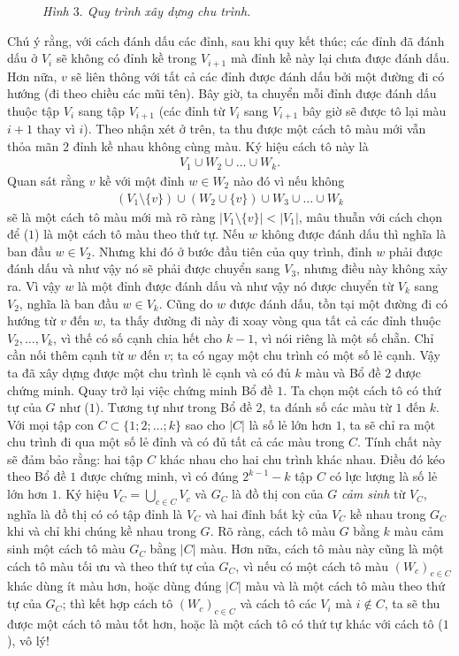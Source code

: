 \begin{multicols}{2}
\begin{figure}[H]
		\caption{\small\textit{\color{hoccungpi}Hình $3.$ Quy trình xây dựng chu trình.}}
		\vspace*{-10pt}
	\end{figure}
	Chú ý rằng, với cách đánh dấu các đỉnh, sau khi quy kết thúc; các đỉnh đã đánh dấu ở $V_i$ sẽ không có đỉnh kề trong $V_{i+1}$ mà đỉnh kề này lại chưa được đánh dấu. Hơn nữa, $v$ sẽ liên thông với tất cả các đỉnh được đánh dấu bởi một đường đi có hướng (đi theo chiều các mũi tên). 
	\vskip 0.1cm
	Bây giờ, ta chuyển mỗi đỉnh được đánh dấu thuộc tập $V_i$ sang tập $V_{i+1}$ (các đỉnh từ $V_i$ sang $V_{i+1}$ bây giờ sẽ được tô lại màu $i+1$ thay vì $i$). Theo nhận xét ở trên, ta thu được một cách tô màu mới vẫn thỏa mãn $2$ đỉnh kề nhau không cùng màu. Ký hiệu cách tô này là 
	\begin{align*}
		V_1 \cup W_2 \cup \dots \cup W_k.
	\end{align*}
	Quan sát rằng $v$ kề với một đỉnh $w \in W_2$ nào đó vì nếu không 
	\begin{align*}
		(V_1 \setminus \{v\}) \cup (W_2 \cup \{v\} ) \cup W_3 \cup \dots \cup W_k
	\end{align*}	
	sẽ là một cách tô màu mới mà rõ ràng  $|V_1 \setminus \{v\}| < |V_1|$, mâu thuẫn với cách chọn để ($1$) là một cách tô màu theo thứ tự. Nếu $w$ không được đánh dấu thì nghĩa là ban đầu $w \in V_2$. Nhưng khi đó ở bước đầu tiên của quy trình, đỉnh $w$ phải được đánh dấu và như vậy nó sẽ phải được chuyển sang $V_3$, nhưng điều này không xảy ra. Vì vậy $w$ là một đỉnh được đánh dấu và như vậy nó được chuyển từ $V_k$ sang $V_2$, nghĩa là ban đầu $w \in V_k$. 
	\vskip 0.1cm
	Cũng do $w$ được đánh dấu, tồn tại một đường đi có hướng từ $v$ đến $w$, ta thấy đường đi này đi xoay vòng qua tất cả các đỉnh thuộc $V_2,\dots,V_k$, vì thế có số cạnh chia hết cho $k-1$, vì nói riêng là một số chẵn. Chỉ cần nối thêm cạnh từ $w$ đến $v$; ta có ngay một chu trình có một số lẻ cạnh. Vậy ta đã xây dựng được một chu trình lẻ cạnh và có đủ $k$ màu và Bổ đề $2$ được chứng minh.
	\vskip 0.1cm
	Quay trở lại việc chứng minh Bổ đề $1$. Ta chọn một cách tô có thứ tự của $G$ như ($1$). Tương tự như trong Bổ đề $2$, ta đánh số các màu từ $1$ đến $k$. Với mọi tập con $C \subset \{1;2;\dots;k\}$ sao cho $|C|$ là số lẻ lớn hơn $1$, ta sẽ chỉ ra một chu trình đi qua một số lẻ đỉnh và có đủ tất cả các màu trong $C$. Tính chất này sẽ đảm bảo rằng: hai tập $C$ khác nhau cho hai chu trình khác nhau. Điều đó kéo theo Bổ đề $1$ được chứng minh, vì có đúng $2^{k-1} -k$ tập $C$ có lực lượng là số lẻ lớn hơn $1$. 
	\vskip 0.1cm
	Ký hiệu $V_C = \bigcup\limits_{c \in C} V_c$ và $G_C$ là đồ thị con của $G$ \textit{cảm sinh} từ $V_C$, nghĩa là đồ thị có có tập đỉnh là $V_C$ và hai đỉnh bất kỳ của $V_C$ kề nhau trong $G_C$ khi và chỉ khi chúng kề nhau trong $G$. Rõ ràng, cách tô màu $G$ bằng $k$ màu cảm sinh một cách tô màu $G_C$ bằng $|C|$ màu. Hơn nữa, cách tô màu này cũng là một cách tô màu tối ưu và theo thứ tự của $G_C$, vì nếu có một cách tô màu $(W_c)_{c \in C}$ khác  dùng ít màu hơn, hoặc dùng đúng $|C|$ màu và là một cách tô màu theo thứ tự của $G_C$; thì kết hợp cách tô $(W_c)_{c \in C}$ và cách tô các $V_i$ mà $ i \notin C$, ta sẽ thu được một cách tô màu tốt hơn, hoặc là một cách tô có thứ tự khác với  cách tô ($1$), vô lý!

\end{multicols}
